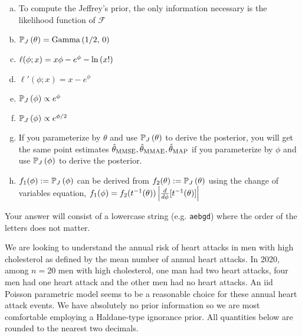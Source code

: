 \documentclass[12pt,landscape]{article}
\newcommand{\instr}{\small Your answer will consist of a lowercase string (e.g. \texttt{aebgd}) where the order of the letters does not matter. \normalsize}
\begin{document}
\begin{enumerate}[(a)]
\item To compute the Jeffrey's prior, the only information necessary is the likelihood function of $\mathcal{F}$
\item $\mathbb{P}_{J}\left(\theta\right) = \mathrm{Gamma}\left(1/2,\,0\right)$
\item $\ell(\phi; x) = x \phi - e^\phi - \ln\left(x!\right)$
\item $\ell'(\phi; x) = x  - e^\phi$
\item $\mathbb{P}_{J}\left(\phi\right) \propto e^{\phi}$
\item $\mathbb{P}_{J}\left(\phi\right) \propto e^{\phi / 2}$
\item If you parameterize by $\theta$ and use $\mathbb{P}_{J}\left(\theta\right)$ to derive the posterior, you will get the same point estimates $\hat{\theta}_{\mathrm{MMSE}}, \hat{\theta}_{\mathrm{MMAE}}, \hat{\theta}_{\mathrm{MAP}}$ if you parameterize by $\phi$ and use $\mathbb{P}_{J}\left(\phi\right)$ to derive the posterior.
\item $f_1(\phi) := \mathbb{P}_{J}\left(\phi\right)$ can be derived from $f_2(\theta) := \mathbb{P}_{J}\left(\theta\right)$ using the change of variables equation, $f_1(\phi) = f_2(t^{-1}(\theta)) \left|\frac{d}{d\phi}[t^{-1}(\theta)]\right|$
\end{enumerate}
\eenum\instr\pagebreak

%
%


\problem{} We are looking to understand the annual risk of heart attacks in men with high cholesterol as defined by the mean number of annual heart attacks. In 2020, among $n = 20$ men with high cholesterol, one man had two heart attacks, four men had one heart attack and the other men had no heart attacks. An iid Poisson parametric model seems to be a reasonable choice for these annual heart attack events. We have absolutely no prior information so we are most comfortable employing a Haldane-type ignorance prior. All quantities below are rounded to the nearest two decimals.
\end{document}
